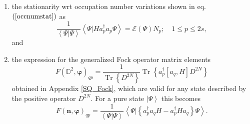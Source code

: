 \documentclass[aps,preprint]{revtex4}%
\begin{document}
\begin{enumerate}
\item the stationarity wrt occupation number variations shown in eq. $\left(
\ref{occnumstat}\right)  $ as
\begin{equation}
\frac{1}{\left\langle \left.  \Psi\right\vert \Psi\right\rangle }\left\langle
\left.  \Psi\right\vert Ha_{p}^{\dagger}a_{p}\Psi\right\rangle =\mathcal{E}%
\left(  \Psi\right)  N_{p};\quad1\leq p\leq2s,
\end{equation}
and

\item the expression for the generalized Fock operator matrix elements
\cite{L&O}
\begin{equation}
F\left(  \mathbb{D}^{2},\bm{\varphi}\right)  _{qp}=\frac{1}{\operatorname{Tr}%
\left\{  D^{2N}\right\}  }\operatorname{Tr}\left\{  a_{p}^{\dagger}\left[
a_{q},H\right]  D^{2N}\right\}
\end{equation}
obtained in Appendix \ref{SQ_Fock}, which are valid for any state described by
the positive operator $D^{2N}$. For a pure state $\left\vert \Psi\right\rangle
$ this becomes
\begin{equation}
F\left(  \bm{n},\bm{\varphi}\right)  _{qp}=\frac{1}{\left\langle \left.
\Psi\right\vert \Psi\right\rangle }\left\langle \left.  \Psi\right\vert
\left\{  a_{p}^{\dagger}a_{q}H-a_{p}^{\dagger}Ha_{q}\right\}  \Psi
\right\rangle .
\end{equation}

\end{enumerate}
\end{document}
